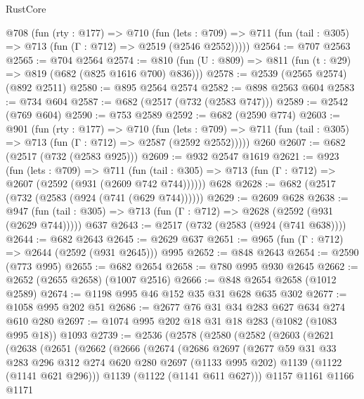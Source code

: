\begin{lexlean}{RustCore}
\begin{coremodule}
  @708
    (fun (rty : @177) =>
    @710
      (fun (lets : @709) =>
      @711 (fun (tail : @305) => @713 (fun (Γ : @712) => @2519 (@2546 @2552)))))
@2564 := @707 @2563
@2565 := @704 @2564
@2574 := @810 (fun (U : @809) => @811 (fun (t : @29) => @819 (@682 (@825 @1616 @700) @836)))
@2578 := @2539 (@2565 @2574) (@892 @2511)
@2580 := @895 @2564 @2574
@2582 := @898 @2563 @604
@2583 := @734 @604
@2587 := @682 (@2517 (@732 (@2583 @747)))
@2589 := @2542 (@769 @604)
@2590 := @753 @2589
@2592 := @682 (@2590 @774)
@2603 := @901
    (fun (rty : @177) =>
    @710
      (fun (lets : @709) =>
      @711 (fun (tail : @305) => @713 (fun (Γ : @712) => @2587 (@2592 @2552)))))
    @260
@2607 := @682 (@2517 (@732 (@2583 @925)))
@2609 := @932 @2547 @1619
@2621 := @923
    (fun (lets : @709) =>
    @711 (fun (tail : @305) => @713 (fun (Γ : @712) => @2607 (@2592 (@931 (@2609 @742 @744))))))
    @628
@2628 := @682 (@2517 (@732 (@2583 (@924 (@741 (@629 @744))))))
@2629 := @2609 @628
@2638 := @947 (fun (tail : @305) => @713 (fun (Γ : @712) => @2628 (@2592 (@931 (@2629 @744))))) @637
@2643 := @2517 (@732 (@2583 (@924 (@741 @638))))
@2644 := @682 @2643
@2645 := @2629 @637
@2651 := @965 (fun (Γ : @712) => @2644 (@2592 (@931 @2645))) @995
@2652 := @848 @2643
@2654 := @2590 (@773 @995)
@2655 := @682 @2654
@2658 := @780 @995 @930 @2645
@2662 := @2652 (@2655 @2658) (@1007 @2516)
@2666 := @848 @2654 @2658 (@1012 @2589)
@2674 := @1198 @995 @46 @152 @35 @31 @628 @635 @302
@2677 := @1058 @995 @202 @51
@2686 := @2677 @76 @31 @34 @283 @627 @634 @274 @610 @280
@2697 := @1074 @995 @202 @18 @31 @18 @283 (@1082 (@1083 @995 @18)) @1093
@2739 := @2536
    (@2578
      (@2580
        (@2582
          (@2603
            (@2621
              (@2638
                (@2651
                  (@2662
                    (@2666
                      (@2674
                        (@2686
                          @2697
                          (@2677
                            @59
                            @31
                            @33
                            @283
                            @296
                            @312
                            @274
                            @620
                            @280
                            @2697
                            (@1133 @995 @202)
                            @1139
                            (@1122 (@1141 @621 @296)))
                          @1139
                          (@1122 (@1141 @611 @627)))
                        @1157
                        @1161
                        @1166
                        @1171

\end{coremodule}
\end{lexlean}
